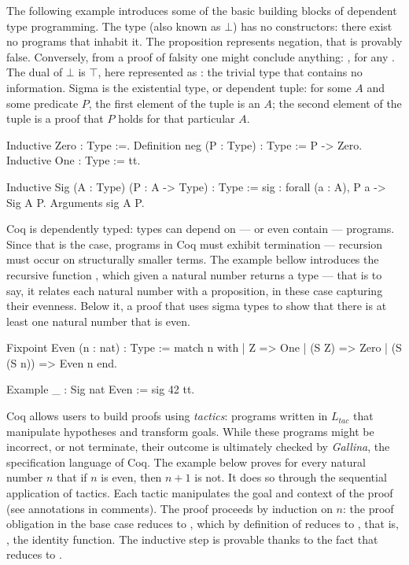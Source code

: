 \documentclass{mproj}
\begin{document}
The following example introduces some of the basic building blocks of dependent type programming. The type  (also known as $\bot$) has no constructors: there exist no programs that inhabit it. The proposition  represents negation, that  is provably false. Conversely, from a proof of falsity one might conclude anything: , for any . The dual of $\bot$ is $\top$, here represented as : the trivial type that contains no information. Sigma is the existential type, or dependent tuple: for some $A$ and some predicate $P$, the first element of the tuple is an $A$; the second element of the tuple is a proof that $P$ holds for that particular $A$.

\begin{coq}
    Inductive Zero : Type :=.
    Definition neg (P : Type) : Type := P -> Zero.
    Inductive One : Type := tt.

    Inductive Sig (A : Type) (P : A -> Type) : Type :=
      sig : forall (a : A), P a -> Sig A P.
    Arguments sig {A P}.
\end{coq}

Coq is dependently typed: types can depend on --- or even contain --- programs. Since that is the case, programs in Coq must exhibit termination --- recursion must occur on structurally smaller terms. The example bellow introduces the recursive function , which given a natural number returns a type --- that is to say, it relates each natural number with a proposition, in these case capturing their evenness. Below it, a proof that uses sigma types to show that there is at least one natural number that is even.

\begin{coq}
    Fixpoint Even (n : nat) : Type :=
      match n with
      | Z         => One
      | (S Z)     => Zero
      | (S (S n)) => Even n
      end.

    Example _ : Sig nat Even := sig 42 tt.
\end{coq}

Coq allows users to build proofs using \emph{tactics}: programs written in $L_{tac}$ that manipulate hypotheses and transform goals. While these programs might be incorrect, or not terminate, their outcome is ultimately checked by \emph{Gallina}, the specification language of Coq. The example below proves for every natural number $n$ that if $n$ is even, then $n+1$ is not. It does so through the sequential application of tactics. Each tactic manipulates the goal and context of the proof (see annotations in comments). The proof proceeds by induction on $n$: the proof obligation in the base case reduces to , which by definition of  reduces to , that is, , the identity function. The inductive step is provable thanks to the fact that  reduces to .
\end{document}
